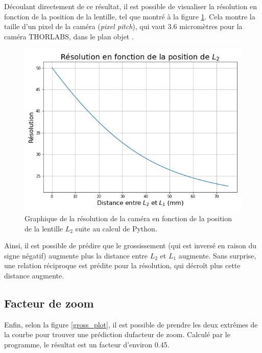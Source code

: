\documentclass[11pt,letterpaper]{article}
\begin{document}
Découlant directement de ce résultat, il est possible de visualiser la résolution en fonction
de la position de la lentille, tel que montré à la figure \ref{res_plot}. Cela montre la taille
d'un pixel de la caméra (\textit{pixel pitch}), qui vaut 3.6 micromètres pour la caméra THORLABS, dans le plan objet \cite{thorlabs}.


\begin{figure}[H]
  \centering
  \includegraphics[scale=0.55]{Resolution.png}
  \caption{Graphique de la résolution de la caméra en fonction de la position de la lentille
  $L_2$ suite au calcul de Python.}
  \label{res_plot}
\end{figure}

Ainsi, il est possible de prédire que le grossissement (qui est inversé en raison du signe 
négatif) augmente plus la distance entre $L_2$ et $L_1$ augmente. Sans surprise, une relation 
réciproque est prédite pour la résolution, qui décroît plus cette distance augmente.

\subsection{Facteur de zoom}

Enfin, selon la figure \ref{gross_plot}, il est possible de prendre les deux extrêmes de la courbe 
pour trouver une prédiction dufacteur de zoom. Calculé par le programme, le résultat est un facteur
d'environ 0.45.
\clearpage



\end{document}
